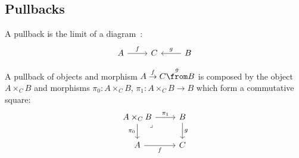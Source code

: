\subsection{Pullbacks}

\begin{definition}[Pullback]

  A pullback is the limit of a
  diagram~\parencite[p.~114]{leinster:basic_category_theory}:
  \[\begin{tikzcd}[ampersand replacement=\&]
    A \& C \& B
    \arrow["g"', from=1-3, to=1-2]
    \arrow["f", from=1-1, to=1-2]
  \end{tikzcd}\]
\end{definition}

\begin{remark}
  A pullback of objects and morphism $A\overset{f}{\to} C \overset{g}{\from} B$
  is composed by the object $A \times_C B$ and morphisms $\pi_0:A \times_C B$,
  $\pi_1: A \times_C B\to B$ which form a commutative square:
  \[\begin{tikzcd}[ampersand replacement=\&]
    {A\times_CB} \& B \\
    A \& C
    \arrow["g", from=1-2, to=2-2]
    \arrow["f"', from=2-1, to=2-2]
    \arrow["{\pi_0}"', from=1-1, to=2-1]
    \arrow["{\pi_1}", from=1-1, to=1-2]
    \arrow["\lrcorner"{anchor=center, pos=0.125}, draw=none, from=1-1, to=2-2]
  \end{tikzcd}\]
\end{remark}


